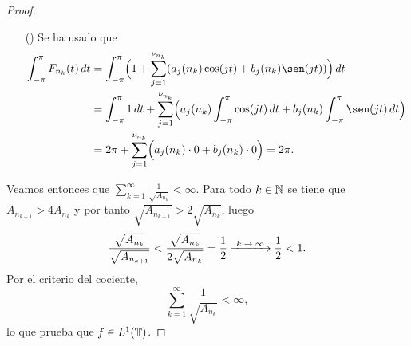 \documentclass[a4paper, 12pt]{book}
\begin{document}
\begin{proof}
\begin{itemize}
        \item[(\asts{2})] Se ha usado que
        \begin{align*}
            \integral{-\pi}{\pi}{F_{n_k}(t)} &= \integral{-\pi}{\pi}{\Bigl(1+\sum_{j=1}^{\nu_{n_k}}(a_j(n_k)\cos(jt)+b_j(n_k)\sen(jt))\Bigr)} \\
            &= \integral{-\pi}{\pi}{1} + \sum_{j=1}^{\nu_{n_k}}\Bigl(a_j(n_k)\integral{-\pi}{\pi}{\cos(jt)}+b_j(n_k)\integral{-\pi}{\pi}{\sen(jt)}\Bigr) \\
            &=2\pi +\sum_{j=1}^{\nu_{n_k}}\Bigl(a_j(n_k)\cdot 0+b_j(n_k) \cdot 0\Bigr) =2\pi.
        \end{align*}
    \end{itemize}
    Veamos entonces que $\sum_{k=1}^\infty \frac{1}{\sqrt{A_{n_k}}} < \infty$. Para todo $k \in \mathbb N$ se tiene que $A_{n_{k+1}} > 4A_{n_{k}}$ y por tanto $\sqrt{A_{n_{k+1}}} > 2\sqrt{A_{n_{k}}}$, luego
    \[\frac{\sqrt{A_{n_k}}}{\sqrt{A_{n_{k+1}}}} < \frac{\sqrt{A_{n_k}}}{2\sqrt{A_{n_k}}} = \frac{1}{2} \kconv \frac{1}{2} < 1.\]
    Por el criterio del cociente, \[\sum_{k=1}^\infty \frac{1}{\sqrt{A_{n_k}}} < \infty,\] lo que prueba que $f \in L^1(\mathbb T)$. 
    

\end{proof}
\end{document}
